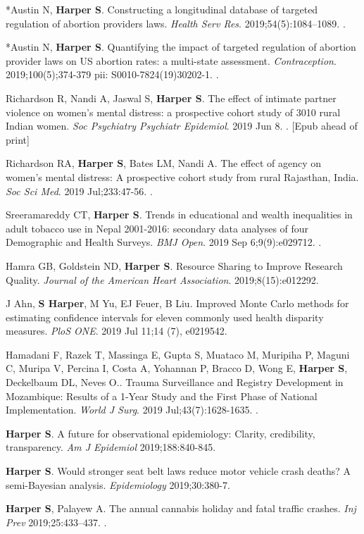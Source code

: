 \documentclass[
  letterpaper,
  DIV=11,
  numbers=noendperiod]{scrartcl}
\begin{document}
*Austin N, \textbf{Harper S}. Constructing a longitudinal database of
targeted regulation of abortion providers laws. \emph{Health Serv Res}.
2019;54(5):1084--1089. .

*Austin N, \textbf{Harper S}. Quantifying the impact of targeted
regulation of abortion provider laws on US abortion rates: a multi-state
assessment. \emph{Contraception}. 2019;100(5);374-379 pii:
S0010-7824(19)30202-1. .

Richardson R, Nandi A, Jaswal S, \textbf{Harper S}. The effect of
intimate partner violence on women's mental distress: a prospective
cohort study of 3010 rural Indian women. \emph{Soc Psychiatry Psychiatr
Epidemiol}. 2019 Jun 8. . {[}Epub ahead of print{]}

Richardson RA, \textbf{Harper S}, Bates LM, Nandi A. The effect of
agency on women's mental distress: A prospective cohort study from rural
Rajasthan, India. \emph{Soc Sci Med}. 2019 Jul;233:47-56. .

Sreeramareddy CT, \textbf{Harper S}. Trends in educational and wealth
inequalities in adult tobacco use in Nepal 2001-2016: secondary data
analyses of four Demographic and Health Surveys. \emph{BMJ Open}. 2019
Sep 6;9(9):e029712. .

Hamra GB, Goldstein ND, \textbf{Harper S}. Resource Sharing to Improve
Research Quality. \emph{Journal of the American Heart Association}.
2019;8(15):e012292.

J Ahn, \textbf{S Harper}, M Yu, EJ Feuer, B Liu. Improved Monte Carlo
methods for estimating confidence intervals for eleven commonly used
health disparity measures. \emph{PloS ONE}. 2019 Jul 11;14 (7),
e0219542.

Hamadani F, Razek T, Massinga E, Gupta S, Muataco M, Muripiha P, Maguni
C, Muripa V, Percina I, Costa A, Yohannan P, Bracco D, Wong E,
\textbf{Harper S}, Deckelbaum DL, Neves O.. Trauma Surveillance and
Registry Development in Mozambique: Results of a 1-Year Study and the
First Phase of National Implementation. \emph{World J Surg}. 2019
Jul;43(7):1628-1635. .

\textbf{Harper S}. A future for observational epidemiology: Clarity,
credibility, transparency. \emph{Am J Epidemiol} 2019;188:840-845.

\textbf{Harper S}. Would stronger seat belt laws reduce motor vehicle
crash deaths? A semi-Bayesian analysis. \emph{Epidemiology}
2019;30:380-7.

\textbf{Harper S}, Palayew A. The annual cannabis holiday and fatal
traffic crashes. \emph{Inj Prev} 2019;25:433--437. .
\end{document}
